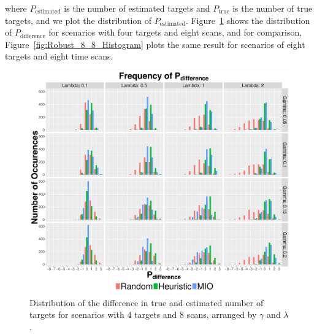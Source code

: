 where $P_{\text{estimated}}$ is the number of estimated targets and $ P_{\text{true}}$ is the number of true targets, and we plot the distribution of $P_{\text{estimated}}$. Figure~\ref{fig:Robust_4_8_Histogram} shows the distribution of $P_{\text{difference}}$ for scenarios with four targets and eight scans, and for comparison, Figure~\ref{fig:Robust_8_8_Histogram} plots the same result for scenarios of eight targets and eight time scans. 
\begin{figure}[ht]
  \centering
  \includegraphics[width=\columnwidth]{../Figures/4_8_Histogram}
  \caption{Distribution of the difference in true and estimated number of targets for scenarios with 4 targets and 8 scans, arranged by $\gamma$ and $\lambda$.}
  \label{fig:Robust_4_8_Histogram}
\end{figure}

